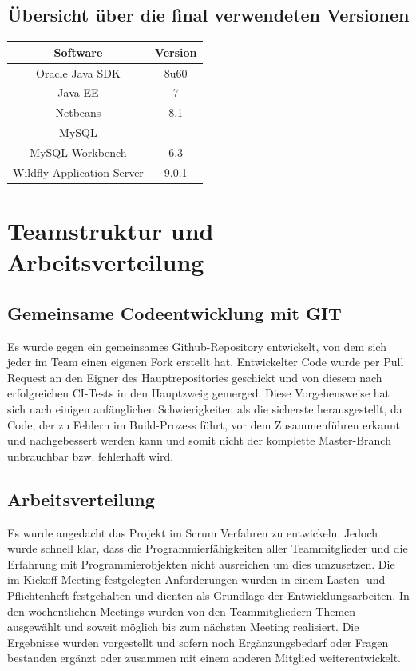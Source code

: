 \documentclass[12pt,a4paper,parskip]{scrreprt}
\begin{document}
\section{Übersicht über die final verwendeten Versionen}
\begin{center}
\begin{tabular}{|c|c|}
\hline
\rule[-1ex]{0pt}{2.5ex} Software & Version  \\ 
\hline 
\rule[-1ex]{0pt}{2.5ex} Oracle Java SDK & 8u60  \\ 
\hline 
\rule[-1ex]{0pt}{2.5ex} Java EE & 7 \\ 
\hline 
\rule[-1ex]{0pt}{2.5ex} Netbeans & 8.1 \\ 
\hline 
\rule[-1ex]{0pt}{2.5ex} MySQL &  \\ 
\hline 
\rule[-1ex]{0pt}{2.5ex} MySQL Workbench & 6.3 \\ 
\hline
\rule[-1ex]{0pt}{2.5ex} Wildfly Application Server & 9.0.1 \\ 
\hline 
\end{tabular}
\end{center}
\chapter{Teamstruktur und Arbeitsverteilung}
\section{Gemeinsame Codeentwicklung mit GIT}
Es wurde gegen ein gemeinsames Github-Repository entwickelt, von dem sich jeder im Team einen eigenen Fork erstellt hat. Entwickelter Code wurde per Pull Request an den Eigner des Hauptrepositories geschickt und von diesem nach erfolgreichen CI-Tests in den Hauptzweig gemerged. Diese Vorgehensweise hat sich nach einigen anfänglichen Schwierigkeiten als die sicherste herausgestellt, da Code, der zu Fehlern im Build-Prozess führt, vor dem Zusammenführen erkannt und nachgebessert werden kann und somit nicht der komplette Master-Branch unbrauchbar bzw. fehlerhaft wird.
\section{Arbeitsverteilung}
Es wurde angedacht das Projekt im Scrum Verfahren zu entwickeln. Jedoch wurde schnell klar, dass die Programmierfähigkeiten aller Teammitglieder und die Erfahrung mit Programmierobjekten nicht ausreichen um dies umzusetzen.
Die im Kickoff-Meeting festgelegten Anforderungen wurden in einem Lasten- und Pflichtenheft festgehalten und dienten als Grundlage der Entwicklungsarbeiten. In den wöchentlichen Meetings wurden von den Teammitgliedern Themen ausgewählt und soweit möglich bis zum nächsten Meeting realisiert. Die Ergebnisse wurden vorgestellt und sofern noch Ergänzungsbedarf oder Fragen bestanden ergänzt oder zusammen mit einem anderen Mitglied weiterentwickelt.
\end{document}
